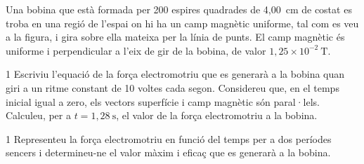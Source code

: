 Una bobina que està formada per 200 espires quadrades de 4,00~cm de costat es troba en una regió de l'espai on hi ha un camp magnètic uniforme, tal com es veu a la figura, i gira sobre ella mateixa per la línia de punts. El camp magnètic és uniforme i perpendicular a l'eix de gir de la bobina, de valor $1,25\times 10^{-2}\ \mathrm{T}$.


\begin{apartat}{1}
Escriviu l'equació de la força electromotriu que es generarà a la bobina quan giri a un ritme constant de 10 voltes cada segon. Considereu que, en el temps inicial igual a zero, els vectors superfície i camp magnètic són paral·lels. Calculeu, per a $t = 1,28\ \mathrm{s}$, el valor de la força electromotriu a la bobina.
\end{apartat}

\begin{apartat}{1}
Representeu la força electromotriu en funció del temps per a dos períodes sencers i determineu-ne el valor màxim i eficaç que es generarà a la bobina.
\end{apartat}
